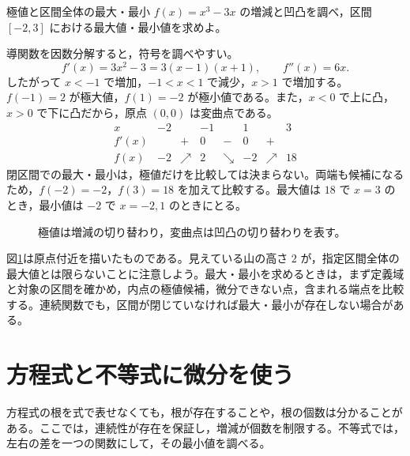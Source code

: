 \begin{example}{極値と区間全体の最大・最小}
$f(x)=x^3-3x$ の増減と凹凸を調べ，区間 $[-2,3]$ における最大値・最小値を求めよ。
\end{example}
導関数を因数分解すると，符号を調べやすい。
\[
 f'(x)=3x^2-3=3(x-1)(x+1),\qquad f''(x)=6x.
\]
したがって $x<-1$ で増加，$-1<x<1$ で減少，$x>1$ で増加する。$f(-1)=2$ が極大値，$f(1)=-2$ が極小値である。また，$x<0$ で上に凸，$x>0$ で下に凸だから，原点 $(0,0)$ は変曲点である。
\[
\begin{array}{c|ccccccc}
 x&-2&&-1&&1&&3\\ \hline
 f'(x)&&+&0&-&0&+&\\
 f(x)&-2&\nearrow&2&\searrow&-2&\nearrow&18
\end{array}
\]
閉区間での最大・最小は，極値だけを比較しては決まらない。両端も候補になるため，$f(-2)=-2$，$f(3)=18$ を加えて比較する。最大値は $18$ で $x=3$ のとき，最小値は $-2$ で $x=-2,1$ のときにとる。

\begin{figure}[htbp]
\centering
{}
\caption{極値は増減の切り替わり，変曲点は凹凸の切り替わりを表す。}
\label{図:三次増減}
\end{figure}

図\ref{図:三次増減}は原点付近を描いたものである。見えている山の高さ $2$ が，指定区間全体の最大値とは限らないことに注意しよう。最大・最小を求めるときは，まず定義域と対象の区間を確かめ，内点の極値候補，微分できない点，含まれる端点を比較する。連続関数でも，区間が閉じていなければ最大・最小が存在しない場合がある。

\section{方程式と不等式に微分を使う}\label{節:微分方程式不等式}
方程式の根を式で表せなくても，根が存在することや，根の個数は分かることがある。ここでは，連続性が存在を保証し，増減が個数を制限する。不等式では，左右の差を一つの関数にして，その最小値を調べる。

